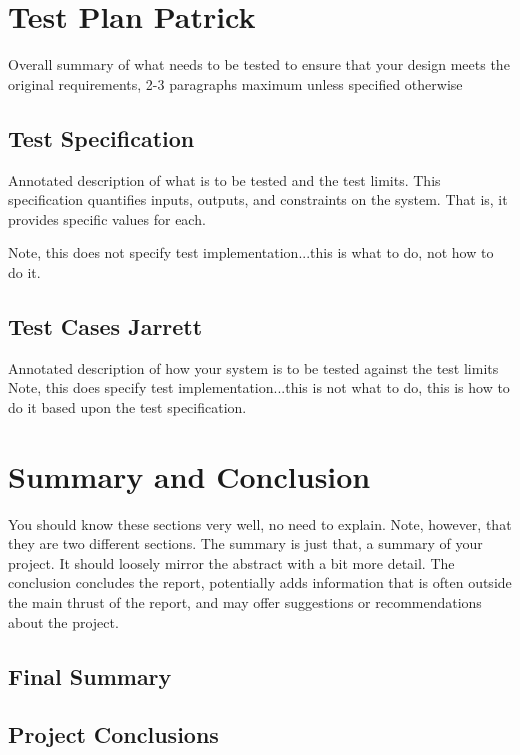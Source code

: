 \documentclass[12pt]{article} %
\begin{document}
\begin{itemize}[$$]
\section{Test Plan Patrick}

Overall summary of what needs to be tested to ensure that your design meets the original requirements, 2-3 paragraphs maximum unless specified otherwise

\subsection{Test Specification}

Annotated description of what is to be tested and the test limits.  This specification quantifies inputs, outputs, and constraints on the system.  That is, it provides specific values for each. 

Note, this does not specify test implementation...this is what to do, not how to do it.

\subsection{Test Cases  Jarrett}

Annotated description of how your system is to be tested against the test limits
Note, this does specify test implementation...this is not what to do, this is how to do it based upon the test specification.

\section{Summary and Conclusion}

You should know these sections very well, no need to explain.  Note, however, that they are two different sections.  The summary is just that, a summary of your project.  It should loosely mirror the abstract with a bit more detail.  The conclusion concludes the report, potentially adds information that is often outside the main thrust of the report, and may offer suggestions or recommendations about the project.

\subsection{Final Summary}


\subsection{Project Conclusions}



\end{itemize}
\end{document}
